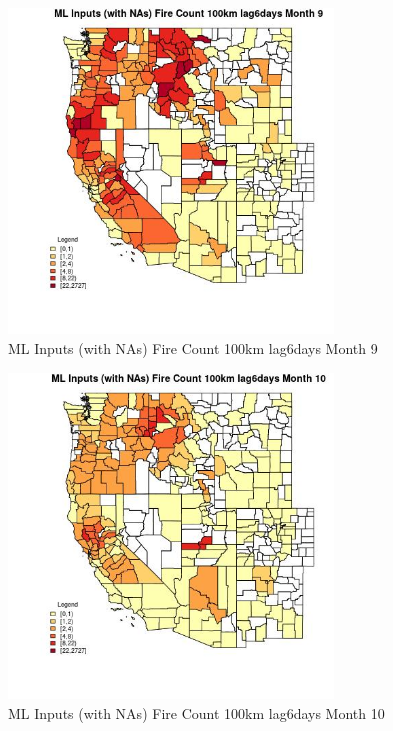 \clearpage 

\begin{figure} 
\centering  
\includegraphics[width=0.77\textwidth]{Code_Outputs/Report_ML_input_PM25_Step4_part_f_de_duplicated_aveswNAs_CountyFire_Count_100km_lag6daysmedianMonth9.jpg} 
\caption{\label{fig:Report_ML_input_PM25_Step4_part_f_de_duplicated_aveswNAsCountyFire_Count_100km_lag6daysmedianMonth9}ML Inputs (with NAs) Fire Count 100km lag6days Month 9} 
\end{figure} 
 

\begin{figure} 
\centering  
\includegraphics[width=0.77\textwidth]{Code_Outputs/Report_ML_input_PM25_Step4_part_f_de_duplicated_aveswNAs_CountyFire_Count_100km_lag6daysmedianMonth10.jpg} 
\caption{\label{fig:Report_ML_input_PM25_Step4_part_f_de_duplicated_aveswNAsCountyFire_Count_100km_lag6daysmedianMonth10}ML Inputs (with NAs) Fire Count 100km lag6days Month 10} 
\end{figure} 
 

